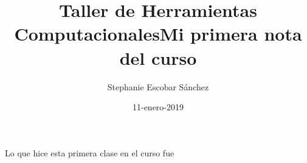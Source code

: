 \documentclass [letterpaper, 12 pts, oneside]{article} %
\title{\Huge Taller de Herramientas Computacionales}
\author{Stephanie Escobar Sánchez}
\date{11-enero-2019}
\begin{document}
	\maketitle
	\newpage
	
	\title{\Huge Mi primera nota del curso}

	Lo que hice esta primera clase en el curso fue 
\end{document}
